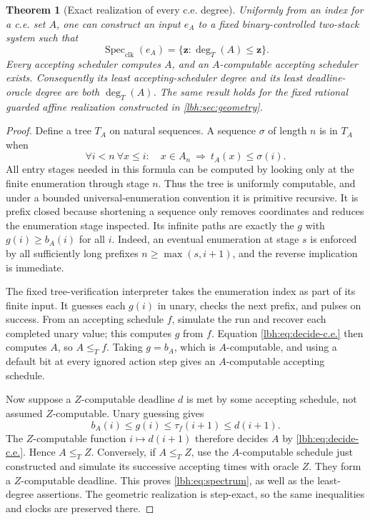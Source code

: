 \documentclass[11pt,letterpaper]{article}
\newtheorem{theorem}{Theorem}[section]
\theoremstyle{definition}
\theoremstyle{remark}
\newcommand{\1}{\mathbf 1}
\begin{document}
\begin{theorem}[Exact realization of every c.e. degree]\label{lbh:thm:ce-spectrum}
Uniformly from an index for a c.e. set $A$, one can construct an input $e_A$
to a fixed binary-controlled two-stack system such that
\begin{equation}\label{lbh:eq:spectrum}
 \operatorname{Spec}_{\mathrm{clk}}(e_A)
   =\{\mathbf z:\deg_T(A)\le\mathbf z\}.
\end{equation}
Every accepting scheduler computes $A$, and an $A$-computable accepting
scheduler exists. Consequently its least accepting-scheduler degree and
its least deadline-oracle degree are both $\deg_T(A)$.
The same result holds for the fixed rational guarded affine realization
constructed in \cref{lbh:sec:geometry}.
\end{theorem}
\begin{proof}
Define a tree $T_A$ on natural sequences. A sequence $\sigma$ of length $n$
is in $T_A$ when
\begin{equation}\label{lbh:eq:c.e.-tree}
 \forall i<n\ \forall x\le i:\quad
 x\in A_n\ \Rightarrow\ t_A(x)\le\sigma(i).
\end{equation}
All entry stages needed in this formula can be computed by looking only at
the finite enumeration through stage $n$. Thus the tree is uniformly
computable, and under a bounded universal-enumeration convention it is
primitive recursive. It is prefix closed because shortening a sequence
only removes coordinates and reduces the enumeration stage inspected.
Its infinite paths are exactly the $g$ with $g(i)\ge b_A(i)$ for all $i$.
Indeed, an eventual enumeration at stage $s$ is enforced by all sufficiently
long prefixes $n\ge\max(s,i+1)$, and the reverse implication is immediate.

The fixed tree-verification interpreter takes the enumeration index as
part of its finite input. It guesses each $g(i)$ in unary, checks the next
prefix, and pulses on success. From an accepting schedule $f$, simulate the
run and recover each completed unary value; this computes $g$ from $f$.
Equation \eqref{lbh:eq:decide-c.e.} then computes $A$, so $A\le_T f$.
Taking $g=b_A$, which is $A$-computable, and using a default bit at every
ignored action step gives an $A$-computable accepting schedule.

Now suppose a $Z$-computable deadline $d$ is met by some accepting schedule,
not assumed $Z$-computable. Unary guessing gives
\[
 b_A(i)\le g(i)\le\tau_f(i+1)\le d(i+1).
\]
The $Z$-computable function $i\mapsto d(i+1)$ therefore decides $A$ by
\cref{lbh:eq:decide-c.e.}. Hence $A\le_T Z$.
Conversely, if $A\le_T Z$, use the $A$-computable schedule just constructed
and simulate its successive accepting times with oracle $Z$. They form a
$Z$-computable deadline. This proves \cref{lbh:eq:spectrum}, as well as the
least-degree assertions. The geometric realization is step-exact, so the
same inequalities and clocks are preserved there.
\end{proof}
\end{document}
